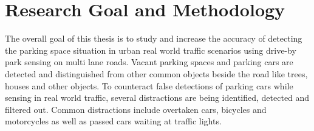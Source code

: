 %
%
%
%
%
%




\section{Research Goal and Methodology}

The overall goal of this thesis is to study and increase the accuracy of detecting the parking space situation in urban real world traffic scenarios using drive-by park sensing on multi lane roads. Vacant parking spaces and parking cars are detected and distinguished from other common objects beside the road like trees, houses and other objects. To counteract false detections of parking cars while sensing in real world traffic, several distractions are being identified, detected and filtered out. Common distractions include overtaken cars, bicycles and motorcycles as well as passed cars waiting at traffic lights.

